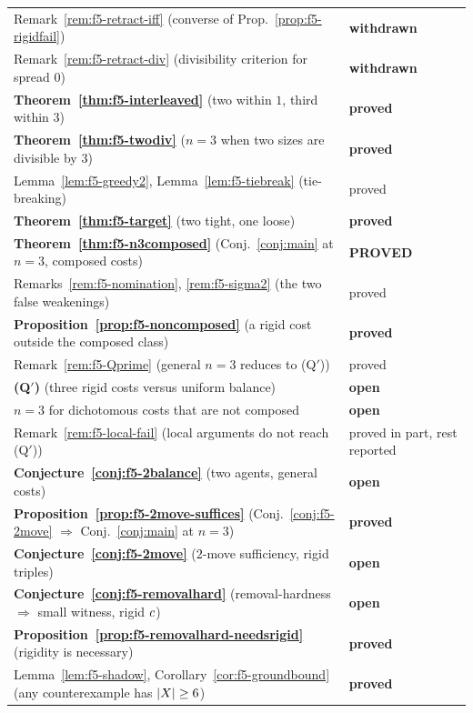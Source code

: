 \begin{center}
\begin{tabular}{@{}ll@{}}
Remark~\ref{rem:f5-retract-iff} (converse of
  Prop.~\ref{prop:f5-rigidfail}) & \textbf{withdrawn} \\
Remark~\ref{rem:f5-retract-div} (divisibility criterion for spread $0$)
  & \textbf{withdrawn} \\
\textbf{Theorem~\ref{thm:f5-interleaved}} (two within $1$, third within $3$)
  & \textbf{proved} \\
\textbf{Theorem~\ref{thm:f5-twodiv}} ($n=3$ when two sizes are divisible by $3$)
  & \textbf{proved} \\
Lemma~\ref{lem:f5-greedy2}, Lemma~\ref{lem:f5-tiebreak} (tie-breaking)
  & proved \\
\textbf{Theorem~\ref{thm:f5-target}} (two tight, one loose)
  & \textbf{proved} \\
\textbf{Theorem~\ref{thm:f5-n3composed}} (Conj.~\ref{conj:main} at $n=3$,
  composed costs) & \textbf{PROVED} \\
Remarks~\ref{rem:f5-nomination}, \ref{rem:f5-sigma2} (the two false
  weakenings) & proved \\
\textbf{Proposition~\ref{prop:f5-noncomposed}} (a rigid cost outside the
  composed class) & \textbf{proved} \\
Remark~\ref{rem:f5-Qprime} (general $n = 3$ reduces to (Q$'$)) & proved \\
\textbf{(Q$'$)} (three rigid costs versus uniform balance) & \textbf{open} \\
$n = 3$ for dichotomous costs that are not composed & \textbf{open} \\
Remark~\ref{rem:f5-local-fail} (local arguments do not reach (Q$'$)) & proved
  in part, rest reported \\
\textbf{Conjecture~\ref{conj:f5-2balance}} (two agents, general costs)
  & \textbf{open} \\
\textbf{Proposition~\ref{prop:f5-2move-suffices}} (Conj.~\ref{conj:f5-2move}
  $\Rightarrow$ Conj.~\ref{conj:main} at $n{=}3$) & \textbf{proved} \\
\textbf{Conjecture~\ref{conj:f5-2move}} ($2$-move sufficiency, rigid triples)
  & \textbf{open} \\
\textbf{Conjecture~\ref{conj:f5-removalhard}} (removal-hardness $\Rightarrow$
  small witness, rigid $c$) & \textbf{open} \\
\textbf{Proposition~\ref{prop:f5-removalhard-needsrigid}} (rigidity is
  necessary) & \textbf{proved} \\
Lemma~\ref{lem:f5-shadow}, Corollary~\ref{cor:f5-groundbound} (any
  counterexample has $\left\lvert X\right\rvert\ge6$) & \textbf{proved} \\

\end{tabular}
\end{center}
